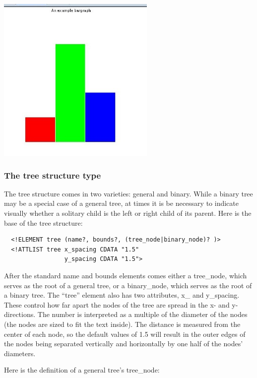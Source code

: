 \documentclass[12pt]{article}
\begin{document}
\begin{center}
  \includegraphics[width=3in]{howto_graphics/bargraph.eps}
\end{center}


\subsubsection{The tree structure type}


The tree structure comes in two varieties: general and binary. While a
binary tree may be a special case of a general tree, at times it is
be necessary to indicate visually whether a solitary child is the left
or right child of its parent. Here is the base of the tree structure:


\footnotesize \begin{verbatim}
  <!ELEMENT tree (name?, bounds?, (tree_node|binary_node)? )>
  <!ATTLIST tree x_spacing CDATA "1.5"
                 y_spacing CDATA "1.5">
\end{verbatim} \normalsize
  
  After the standard name and bounds elements comes either a
  tree\_node, which serves as the root of a general tree, or a
  binary\_node, which serves as the root of a binary tree. The
  ``tree'' element also has two attributes, x\_ and y\_spacing. These
  control how far apart the nodes of the tree are spread in the x-
  and y-directions. The number is interpreted as a multiple of the
  diameter of the nodes (the nodes are sized to fit the text inside).
  The distance is measured from the center of each node, so the
  default values of 1.5 will result in the outer edges of the nodes
  being separated vertically and horizontally by one half of the
  nodes' diameters.

Here is the definition of a general tree's tree\_node:
\end{document}
